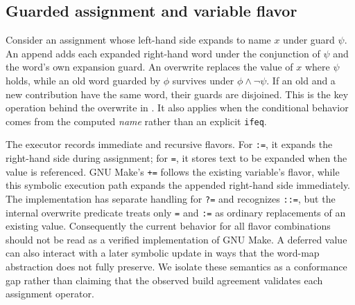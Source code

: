 \documentclass[acmsmall,screen,review]{acmart}
\begin{document}
\subsection{Guarded assignment and variable flavor}
Consider an assignment whose left-hand side expands to name $x$ under guard $\psi$. An append adds each expanded right-hand word under the conjunction of $\psi$ and the word's own expansion guard. An overwrite replaces the value of $x$ where $\psi$ holds, while an old word guarded by $\phi$ survives under $\phi\land\neg\psi$. If an old and a new contribution have the same word, their guards are disjoined. This is the key operation behind the overwrite in . It also applies when the conditional behavior comes from the computed \emph{name} rather than an explicit \texttt{ifeq}.

The executor records immediate and recursive flavors. For \texttt{:=}, it expands the right-hand side during assignment; for \texttt{=}, it stores text to be expanded when the value is referenced. GNU Make's \texttt{+=} follows the existing variable's flavor, while this symbolic execution path expands the appended right-hand side immediately. The implementation has separate handling for \texttt{?=} and recognizes \texttt{::=}, but the internal overwrite predicate treats only \texttt{=} and \texttt{:=} as ordinary replacements of an existing value. Consequently the current behavior for all flavor combinations should not be read as a verified implementation of GNU Make. A deferred value can also interact with a later symbolic update in ways that the word-map abstraction does not fully preserve. We isolate these semantics as a conformance gap rather than claiming that the observed build agreement validates each assignment operator.
\end{document}
